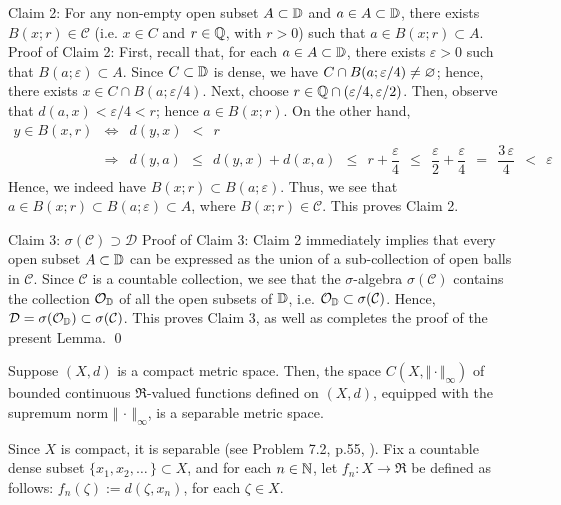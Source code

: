 \vskip 0.5cm
\noindent
Claim 2:\;\; For any non-empty open subset $A \subset \mathbb{D}$ and $a \in A \subset \mathbb{D}$,
there exists $B(x;r) \in \mathcal{C}$ (i.e. $x \in C$ and $r \in \mathbb{Q}$, with $r > 0$)
such that $a \in B(x;r) \subset A$.
\vskip 0.1cm
\noindent
Proof of Claim 2:\; First, recall that, for each $a \in A \subset \mathbb{D}$,
there exists $\varepsilon > 0$ such that $B(a;\varepsilon) \subset A$.
Since $C \subset \mathbb{D}$ is dense, we have $C \cap B(a;\varepsilon/4) \neq \varnothing$;
hence, there exists $x \in C \cap B(a;\varepsilon/4)$.
Next, choose $r \in \mathbb{Q} \cap (\varepsilon/4,\varepsilon/2)$.
Then, observe that $d(a,x) < \varepsilon/4 < r$; hence $a \in B(x;r)$.
On the other hand,
\begin{eqnarray*}
y \in B(x,r)
& \Longleftrightarrow &
	d(y,x) \;\, < \;\, r
\\
& \Longrightarrow &
	d(y,a)
	\,\;\leq\;\, d(y,x) + d(x,a)
	\,\;\leq\;\, r + \dfrac{\varepsilon}{4}
	\,\;\leq\;\, \dfrac{\varepsilon}{2} + \dfrac{\varepsilon}{4}
	\,\;=\;\, \dfrac{3\,\varepsilon}{4}
	\,\;<\;\, \varepsilon
\end{eqnarray*}
Hence, we indeed have $B(x;r) \subset B(a;\varepsilon)$.
Thus, we see that $a \in B(x;r) \subset B(a;\varepsilon) \subset A$,
where $B(x;r) \in \mathcal{C}$.
This proves Claim 2.

\vskip 0.5cm
\noindent
Claim 3:\;\; $\sigma(\mathcal{C}) \supset \mathcal{D}$
\vskip 0.1cm
\noindent
Proof of Claim 3:\; Claim 2 immediately implies that every open subset $A \subset \mathbb{D}$
can be expressed as the union of a sub-collection of open balls in $\mathcal{C}$.
Since $\mathcal{C}$ is a countable collection, we see that
the $\sigma$-algebra $\sigma(\mathcal{C})$ contains the collection $\mathcal{O}_{\mathbb{D}}$ 
of all the open subsets of $\mathbb{D}$, i.e. $\mathcal{O}_{\mathbb{D}} \subset \sigma(\mathcal{C})$.
Hence, $\mathcal{D} = \sigma(\mathcal{O}_{\mathbb{D}}) \subset \sigma(\mathcal{C})$.
This proves Claim 3, as well as completes the proof of the present Lemma.
\qed


\begin{proposition}
\mbox{}\vskip 0.1cm
\noindent
Suppose $(X,d)$ is a compact metric space.
Then, the space $C(X,\Vert\cdot\Vert_{\infty})$ of bounded continuous $\Re$-valued
functions defined on $(X,d)$, equipped with the supremum norm $\Vert\,\cdot\,\Vert_{\infty}$,
is a separable metric space.
\end{proposition}
\proof
Since $X$ is compact, it is separable (see Problem 7.2, p.55, \cite{Aliprantis1998}).
Fix a countable dense subset $\{x_{1},x_{2},\ldots\,\} \subset X$, and
for each $n \in \mathbb{N}$, let $f_{n} : X \longrightarrow \Re$ be defined as follows:
$f_{n}(\zeta) := d(\zeta,x_{n})$, for each $\zeta \in X$.

